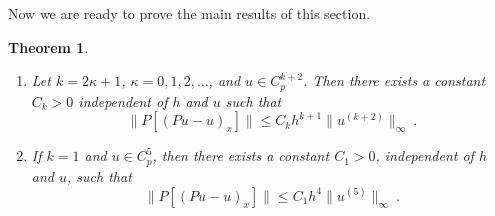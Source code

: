 \documentclass{amsart}
\newtheorem{theorem}{Theorem}[section]
\begin{document}
Now we are ready to prove the main results of this section. 
%
\begin{theorem}\label{thm:main1}
\begin{enumerate}
\item[(i)] Let $k=2\kappa+1$, $\kappa=0,1,2,\dots$, and $u\in C_p^{k+2}$. Then there exists a constant $C_k>0$ independent of $h$ and $u$ such that
\begin{equation}\label{eq:onepone}
\|P[(Pu-u)_x]\|\leq C_k h^{k+1}\|u^{(k+2)}\|_\infty\ .
\end{equation}
\item[(ii)]
If $k=1$ and $u\in C_p^5$, then there exists a constant $C_1>0$, independent of $h$ and $u$, such that
\begin{equation}\label{eq:oneptwo}
\|P[(Pu-u)_x]\|\leq C_1 h^4\|u^{(5)}\|_\infty\ .
\end{equation}
\end{enumerate}
\end{theorem}
%
\end{document}
